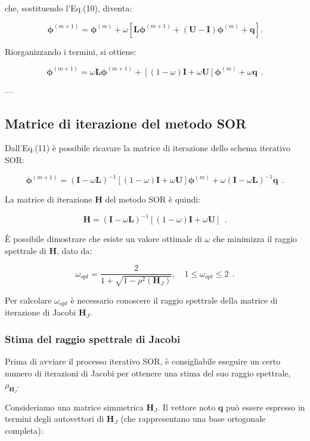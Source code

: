 che, sostituendo l'Eq.(10), diventa:

\[
\mathbf{\phi}^{(m+1)} = \mathbf{\phi}^{(m)} + \omega \left[ \mathbf{L} \mathbf{\phi}^{(m+1)} + (\mathbf{U} - \mathbf{I}) \mathbf{\phi}^{(m)} + \mathbf{q} \right].
\]

Riorganizzando i termini, si ottiene:

\[
\mathbf{\phi}^{(m+1)} = \omega \mathbf{L} \mathbf{\phi}^{(m+1)} + \left[ (1 - \omega) \mathbf{I} + \omega \mathbf{U} \right] \mathbf{\phi}^{(m)} + \omega \mathbf{q}\ \ . 
\]

---

\subsection{Matrice di iterazione del metodo SOR}

Dall'Eq.(11) è possibile ricavare la matrice di iterazione dello schema iterativo SOR:

\[
\mathbf{\phi}^{(m+1)} = \left( \mathbf{I} - \omega \mathbf{L} \right)^{-1} \left[ (1 - \omega) \mathbf{I} + \omega \mathbf{U} \right] \mathbf{\phi}^{(m)} + \omega \left( \mathbf{I} - \omega \mathbf{L} \right)^{-1} \mathbf{q}\ \ . 
\]

La matrice di iterazione \(\mathbf{H}\) del metodo SOR è quindi:

\[
\mathbf{H} = \left( \mathbf{I} - \omega \mathbf{L} \right)^{-1} \left[ (1 - \omega) \mathbf{I} + \omega \mathbf{U} \right]\ \ . 
\]

È possibile dimostrare che esiste un valore ottimale di \(\omega\) che minimizza il raggio spettrale di \(\mathbf{H}\), dato da:

\[
\omega_{opt} = \frac{2}{1 + \sqrt{1 - \rho^2(\mathbf{H}_J)}}, \quad 1 \leq \omega_{opt} \leq 2\ \ . 
\]

Per calcolare \(\omega_{opt}\) è necessario conoscere il raggio spettrale della matrice di iterazione di Jacobi \(\mathbf{H}_J\).

\subsubsection{Stima del raggio spettrale di Jacobi}

Prima di avviare il processo iterativo SOR, è consigliabile eseguire un certo numero di iterazioni di Jacobi per ottenere una stima del suo raggio spettrale, \(\rho_{\mathbf{H}_J}\).

Consideriamo una matrice simmetrica \(\mathbf{H}_J\). Il vettore noto \(\mathbf{q}\) può essere espresso in termini degli autovettori di \(\mathbf{H}_J\) (che rappresentano una base ortogonale completa):


